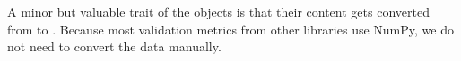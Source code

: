 \documentclass[letterpaper,10pt,english]{jupyterBook}
\begin{document}
\sphinxAtStartPar
A minor but valuable trait of the  objects is that their content gets converted from  to .
Because most validation metrics from other libraries use NumPy, we do not need to convert the data manually.
\begin{sphinxVerbatimInput}

\begin{sphinxVerbatim}[commandchars=\\\{\}]
  
    \PYG{p}{[} \PYG{p}{]}
\end{sphinxVerbatim}
\end{sphinxVerbatimInput}
\end{document}
